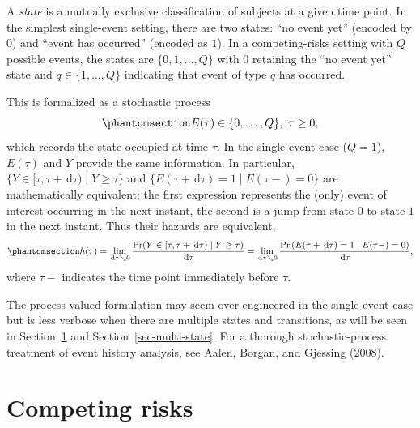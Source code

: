 \documentclass[
  letterpaper,
  krantz2]{style/krantz}
\begin{document}
A \emph{state} is a mutually exclusive classification of subjects at a
given time point. In the simplest single-event
setting, there are two states: ``no event yet'' (encoded by \(0\)) and
``event has occurred'' (encoded as \(1\)). In a competing-risks setting
with \(Q\) possible events, the states are \(\{0, 1, \ldots, Q\}\) with
\(0\) retaining the ``no event yet'' state and
\(q \in \{1, \ldots, Q\}\) indicating that event of type \(q\) has
occurred.

This is formalized as a stochastic process
\begin{equation}\phantomsection\label{eq-state-process}{
E(\tau) \in \{0,\ldots, Q\},\ \tau \geq 0,
}\end{equation} which records the state occupied at time \(\tau\). In
the single-event case (\(Q = 1\)), \(E(\tau)\) and \(Y\) provide the
same information. In particular,
\(\{Y \in [\tau, \tau + \,\mathrm{d}\tau) \mid Y \geq \tau\}\) and
\(\{E(\tau + \,\mathrm{d}\tau) = 1 \mid E(\tau-) = 0\}\) are
mathematically equivalent; the first expression represents the (only)
event of interest occurring in the next instant, the second is a jump
from state \(0\) to state \(1\) in the next instant. Thus their hazards
are equivalent,
\begin{equation}\phantomsection\label{eq-continuous-hazard-process}{
h(\tau)
  = \lim_{\,\mathrm{d}\tau\searrow 0}\frac{\Pr(Y \in [\tau, \tau + \,\mathrm{d}\tau) \mid Y \geq \tau)}{\,\mathrm{d}\tau}
  = \lim_{\,\mathrm{d}\tau\searrow 0}\frac{ \Pr\left(E(\tau + \,\mathrm{d}\tau)=1 \mid E(\tau-)=0\right)}{\,\mathrm{d}\tau},
}\end{equation} where \(\tau-\) indicates the time point immediately
before \(\tau\).

The process-valued formulation may seem over-engineered in the
single-event case but is less verbose when there are multiple states and
transitions, as will be seen in Section~\ref{sec-competing-risks} and
Section~\ref{sec-multi-state}. For a thorough stochastic-process
treatment of event history analysis, see Aalen, Borgan, and Gjessing
(2008).

\section{Competing risks}\label{sec-competing-risks}
\end{document}
